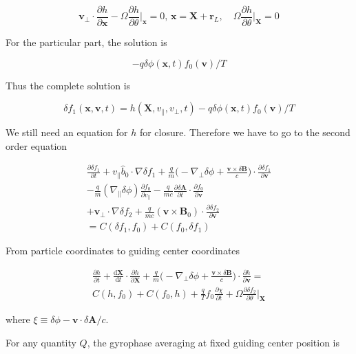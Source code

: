 \documentclass[
  notoc %
]{tufte-book}
\begin{document}
\[
\mathbf{v}_\perp\cdot\frac{\partial h}{\partial\mathbf{x}} - \Omega\frac{\partial h}{\partial\theta}\bigg\rvert_\mathbf{x} = 0,\, \mathbf{x} = \mathbf{X} + \mathbf{r}_L,\quad \Omega\frac{\partial h}{\partial\theta}\bigg\rvert_\mathbf{X}=0
\]

For the particular part, the solution is

\[
-q\delta \phi(\mathbf{x},t)f_0(\mathbf{v})/T
\]

Thus the complete solution is

\[
\delta f_1(\mathbf{x},\mathbf{v},t) = h(\mathbf{X},v_\parallel,v_\perp,t) - q\delta\phi(\mathbf{x},t)f_0(\mathbf{v})/T
\]

We still need an equation for \(h\) for closure. Therefore we have to go
to the second order equation

\[
\begin{aligned}
\frac{\partial\delta f_1}{\partial t}+v_\parallel\hat{b}_0\cdot\nabla\delta f_1 + \frac{q}{m}\Big( -\nabla_\perp \delta\phi + \frac{\mathbf{v}\times\delta\mathbf{B}}{c} \Big)\cdot\frac{\partial\delta f_1}{\partial\mathbf{v}} \\
- \frac{q}{m}(\nabla_\parallel \delta\phi)\frac{\partial f_0}{\partial v_\parallel} - \frac{q}{mc}\frac{\partial\delta\mathbf{A}}{\partial t}\cdot\frac{\partial f_0}{\partial \mathbf{v}} \\
+ \mathbf{v}_\perp\cdot\nabla\delta f_2 + \frac{q}{mc}(\mathbf{v}\times\mathbf{B}_0)\cdot\frac{\partial\delta f_2}{\partial\mathbf{v}} \\
= C(\delta f_1, f_0) + C(f_0,\delta f_1)
\end{aligned}
\]

From particle coordinates to guiding center coordinates

\[
\begin{aligned}
\frac{\partial h}{\partial t} + \frac{\mathrm{d}\mathbf{X}}{\mathrm{d}t}\cdot\frac{\partial h}{\partial\mathbf{X}} + \frac{q}{m}\Big( -\nabla_\perp\delta\phi + \frac{\mathbf{v}\times\delta\mathbf{B}}{c} \Big)\cdot\frac{\partial h}{\partial\mathbf{v}} = \\
C(h,f_0) + C(f_0, h) + \frac{q}{T}f_0\frac{\partial \chi}{\partial t} + \Omega\frac{\partial\delta f_2}{\partial\theta}\bigg\rvert_\mathbf{X}
\end{aligned}
\]

where \(\xi\equiv\delta\phi - \mathbf{v}\cdot\delta\mathbf{A}/c\).

For any quantity \(Q\), the gyrophase averaging at fixed guiding center
position is
\end{document}
